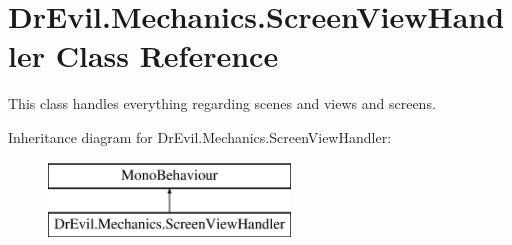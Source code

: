 \hypertarget{class_dr_evil_1_1_mechanics_1_1_screen_view_handler}{}\section{Dr\+Evil.\+Mechanics.\+Screen\+View\+Handler Class Reference}
\label{class_dr_evil_1_1_mechanics_1_1_screen_view_handler}


This class handles everything regarding scenes and views and screens.  


Inheritance diagram for Dr\+Evil.\+Mechanics.\+Screen\+View\+Handler\+:\begin{figure}[H]
\begin{center}
\leavevmode
\includegraphics[height=2.000000cm]{class_dr_evil_1_1_mechanics_1_1_screen_view_handler}
\end{center}
\end{figure}
